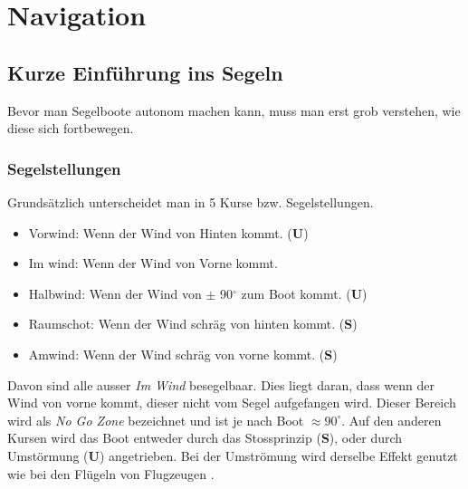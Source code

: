 
\chapter{Navigation}
\label{chap:autonomie}


\section{Kurze Einführung ins Segeln}
Bevor man Segelboote autonom machen kann, muss man erst grob verstehen, wie diese sich fortbewegen.
\subsection{Segelstellungen}
Grundsätzlich unterscheidet man in 5 Kurse bzw. Segelstellungen.
\begin{itemize}
    \item Vorwind: Wenn der Wind von Hinten kommt. (\textbf{U})
    \item Im wind: Wenn der Wind von Vorne kommt.
    \item Halbwind: Wenn der Wind von $\pm$ 90$^{\circ}$ zum Boot kommt. (\textbf{U})
    \item Raumschot: Wenn der Wind schräg von hinten kommt. (\textbf{S})
    \item Amwind: Wenn der Wind schräg von vorne kommt. (\textbf{S})
\end{itemize}
Davon sind alle ausser \textit{Im Wind} besegelbaar. Dies liegt daran, dass wenn der Wind von vorne kommt, dieser nicht vom Segel aufgefangen wird. Dieser Bereich wird als \textit{No Go Zone} bezeichnet und ist je nach Boot $\approx 90^{\circ}$. Auf den anderen Kursen wird das Boot entweder durch das Stossprinzip (\textbf{S}), oder durch Umstörmung (\textbf{U}) angetrieben. Bei der Umströmung wird derselbe Effekt genutzt wie bei den Flügeln von Flugzeugen .  
